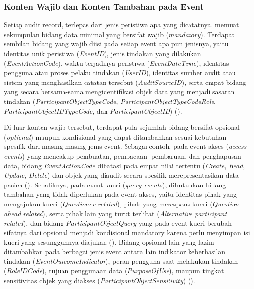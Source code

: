 \subsubsection{Konten Wajib dan Konten Tambahan pada Event}
\label{subsubsec:konten-event}

Setiap audit record, terlepas dari jenis peristiwa apa yang dicatatnya, memuat sekumpulan bidang data minimal yang bersifat wajib (\textit{mandatory}). Terdapat sembilan bidang yang wajib diisi pada setiap event apa pun jenisnya, yaitu identitas unik peristiwa (\textit{EventID}), jenis tindakan yang dilakukan (\textit{EventActionCode}), waktu terjadinya peristiwa (\textit{EventDateTime}), identitas pengguna atau proses pelaku tindakan (\textit{UserID}), identitas sumber audit atau sistem yang menghasilkan catatan tersebut (\textit{AuditSourceID}), serta empat bidang yang secara bersama-sama mengidentifikasi objek data yang menjadi sasaran tindakan (\textit{ParticipantObjectTypeCode}, \textit{ParticipantObjectTypeCodeRole}, \textit{ParticipantObjectIDTypeCode}, dan \textit{ParticipantObjectID}) (\cite{iso27789_2021}).

Di luar konten wajib tersebut, terdapat pula sejumlah bidang bersifat opsional (\textit{optional}) maupun kondisional yang dapat ditambahkan sesuai kebutuhan spesifik dari masing-masing jenis event. Sebagai contoh, pada event akses (\textit{access events}) yang mencakup pembuatan, pembacaan, pembaruan, dan penghapusan data, bidang \textit{EventActionCode} dibatasi pada empat nilai tertentu (\textit{Create}, \textit{Read}, \textit{Update}, \textit{Delete}) dan objek yang diaudit secara spesifik merepresentasikan data pasien (\cite{iso27789_2021}). Sebaliknya, pada event kueri (\textit{query events}), dibutuhkan bidang tambahan yang tidak diperlukan pada event akses, yaitu identitas pihak yang mengajukan kueri (\textit{Questioner related}), pihak yang merespons kueri (\textit{Question ahead related}), serta pihak lain yang turut terlibat (\textit{Alternative participant related}), dan bidang \textit{ParticipantObjectQuery} yang pada event kueri berubah sifatnya dari opsional menjadi kondisional mandatory karena perlu menyimpan isi kueri yang sesungguhnya diajukan (\cite{iso27789_2021}). Bidang opsional lain yang lazim ditambahkan pada berbagai jenis event antara lain indikator keberhasilan tindakan (\textit{EventOutcomeIndicator}), peran pengguna saat melakukan tindakan (\textit{RoleIDCode}), tujuan penggunaan data (\textit{PurposeOfUse}), maupun tingkat sensitivitas objek yang diakses (\textit{ParticipantObjectSensitivity}) (\cite{iso27789_2021}).

